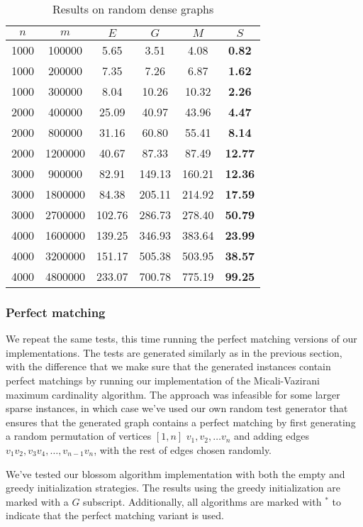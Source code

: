 \begin{table}
\centering
\begin{tabular}{
cc|cccc}
$n$ & $m$ & $E$ & $G$ & $M$ & $S$ \\
\hline
1000 & 100000 & 5.65 & 3.51 & 4.08 & \textbf{0.82} \\
1000 & 200000 & 7.35 & 7.26 & 6.87 & \textbf{1.62} \\
1000 & 300000 & 8.04 & 10.26 & 10.32 & \textbf{2.26} \\
2000 & 400000 & 25.09 & 40.97 & 43.96 & \textbf{4.47} \\
2000 & 800000 & 31.16 & 60.80 & 55.41 & \textbf{8.14} \\
2000 & 1200000 & 40.67 & 87.33 & 87.49 & \textbf{12.77} \\
3000 & 900000 & 82.91 & 149.13 & 160.21 & \textbf{12.36} \\
3000 & 1800000 & 84.38 & 205.11 & 214.92 & \textbf{17.59} \\
3000 & 2700000 & 102.76 & 286.73 & 278.40 & \textbf{50.79} \\
4000 & 1600000 & 139.25 & 346.93 & 383.64 & \textbf{23.99} \\
4000 & 3200000 & 151.17 & 505.38 & 503.95 & \textbf{38.57} \\
4000 & 4800000 & 233.07 & 700.78 & 775.19 & \textbf{99.25} \\
\end{tabular}
\caption{Results on random dense graphs}\label{tab:dense}
\end{table}

\subsubsection*{Perfect matching}

We repeat the same tests, this time running the perfect matching versions of our implementations. The tests are generated similarly as in the previous section, with the difference that we make sure that the generated instances contain perfect matchings by running our implementation of the Micali-Vazirani maximum cardinality algorithm. The approach was infeasible for some larger sparse instances, in which case we've used our own random test generator that ensures that the generated graph contains a perfect matching by first generating a random permutation of vertices $[1, n]$ $v_1, v_2, \dots v_n$ and adding edges $v_1v_2, v_3v_4, \dots, v_{n-1}v_n$, with the rest of edges chosen randomly.

We've tested our blossom algorithm implementation with both the empty and greedy initialization strategies. The results using the greedy initialization are marked with a $G$ subscript. Additionally, all algorithms are marked with $^*$ to indicate that the perfect matching variant is used.

